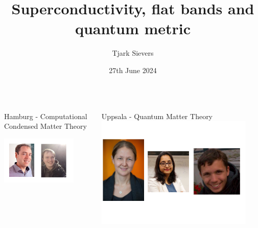 \documentclass[aspectratio=169]{beamer}
\title{Superconductivity, flat bands and quantum metric}
\author{Tjark Sievers}
\date{27th June 2024}
\institute[I. ITP - Computational Condensed Matter Theory]{I. Institute of Theoretical Physics}
\begin{document}
	

{
\begin{frame}
	\titlepage
\end{frame}
}
\addtocounter{framenumber}{-1}

\begin{frame}
	
	\begin{columns}[T]
		\begin{column}{0.5\textwidth}
			\begin{center}
				Hamburg - Computational Condensed Matter Theory
				
				\includegraphics[width=0.8\textwidth]{figs/People Tim.png}
			\end{center}	
		\end{column}
		\begin{column}{0.5\textwidth}
			\begin{center}
				Uppsala - Quantum Matter Theory
				\includegraphics[width=0.9\textwidth]{figs/People Annica.png}
			\end{center}
		\end{column}
	\end{columns}
\end{frame}
\end{document}
